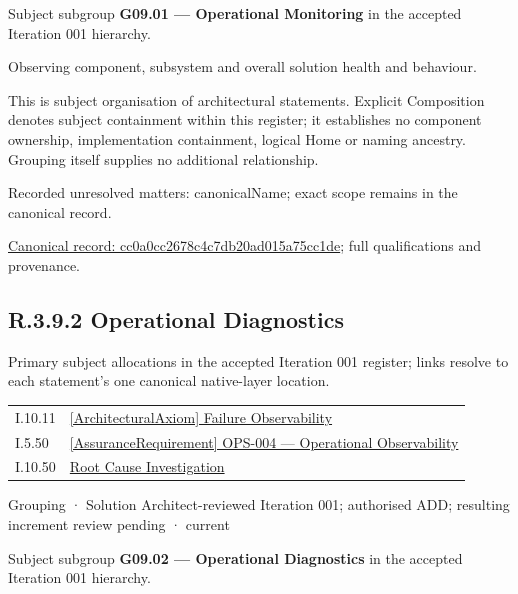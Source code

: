 Subject subgroup \textbf{G09.01 — Operational Monitoring} in the accepted Iteration 001 hierarchy.



Observing component, subsystem and overall solution health and behaviour.



This is subject organisation of architectural statements. Explicit Composition denotes subject containment within this register; it establishes no component ownership, implementation containment, logical Home or naming ancestry. Grouping itself supplies no additional relationship.


{\small Recorded unresolved matters: canonicalName; exact scope remains in the canonical record.}\par
{\footnotesize \href{../../../../continuum/grouping/cc0a0cc2678c4c7db20ad015a75cc1de.md}{Canonical record: cc0a0cc2678c4c7db20ad015a75cc1de}; full qualifications and provenance.}\par
\subsection*{R.3.9.2 Operational Diagnostics}
\label{navigation:R.3.9.2}

Primary subject allocations in the accepted Iteration 001 register; links resolve to each statement’s one canonical native-layer location.\par
\begin{longtable}{p{.22\linewidth}p{.73\linewidth}}
I.10.11 & \hyperref[element:2ed20179a98d44a68880958155e47923]{[ArchitecturalAxiom] Failure Observability} \\
I.5.50 & \hyperref[element:b5d3447a05b249a8af154136fc36c4d9]{[AssuranceRequirement] OPS-004 — Operational Observability} \\
I.10.50 & \hyperref[element:9cdbf642158c4c37a6f3f10a6dd9ebfe]{Root Cause Investigation} \\
\end{longtable}
\label{element:45cb08d300b74853b456f333572a2bf6}
{\small Grouping · Solution Architect-reviewed Iteration 001; authorised ADD; resulting increment review pending · current}\par

Subject subgroup \textbf{G09.02 — Operational Diagnostics} in the accepted Iteration 001 hierarchy.



